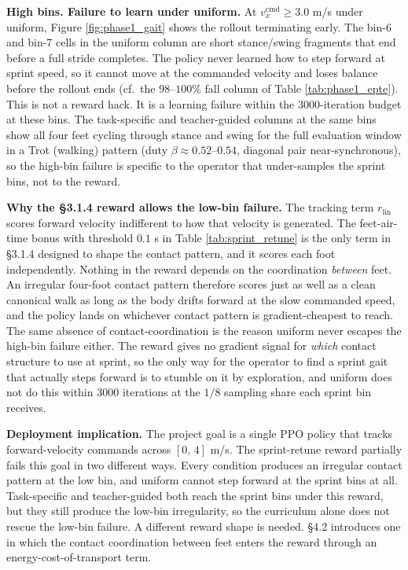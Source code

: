 \textbf{High bins. Failure to learn under uniform.} At $v_x^{\mathrm{cmd}} \ge 3.0$ m/s under uniform, Figure \ref{fig:phase1_gait} shows the rollout terminating early. The bin-6 and bin-7 cells in the uniform column are short stance/swing fragments that end before a full stride completes. The policy never learned how to step forward at sprint speed, so it cannot move at the commanded velocity and loses balance before the rollout ends (cf.\ the $98$--$100\%$ fall column of Table \ref{tab:phase1_epte}). This is not a reward hack. It is a learning failure within the $3000$-iteration budget at these bins. The task-specific and teacher-guided columns at the same bins show all four feet cycling through stance and swing for the full evaluation window in a Trot (walking) pattern (duty $\beta \approx 0.52$--$0.54$, diagonal pair near-synchronous), so the high-bin failure is specific to the operator that under-samples the sprint bins, not to the reward.

\textbf{Why the \S3.1.4 reward allows the low-bin failure.} The tracking term $r_{\mathrm{lin}}$ scores forward velocity indifferent to how that velocity is generated. The feet-air-time bonus with threshold $0.1$ s in Table \ref{tab:sprint_retune} is the only term in \S3.1.4 designed to shape the contact pattern, and it scores each foot independently. Nothing in the reward depends on the coordination \textit{between} feet. An irregular four-foot contact pattern therefore scores just as well as a clean canonical walk as long as the body drifts forward at the slow commanded speed, and the policy lands on whichever contact pattern is gradient-cheapest to reach. The same absence of contact-coordination is the reason uniform never escapes the high-bin failure either. The reward gives no gradient signal for \textit{which} contact structure to use at sprint, so the only way for the operator to find a sprint gait that actually steps forward is to stumble on it by exploration, and uniform does not do this within $3000$ iterations at the $1/8$ sampling share each sprint bin receives.

\textbf{Deployment implication.} The project goal is a single PPO policy that tracks forward-velocity commands across $[0,\,4]$ m/s. The sprint-retune reward partially fails this goal in two different ways. Every condition produces an irregular contact pattern at the low bin, and uniform cannot step forward at the sprint bins at all. Task-specific and teacher-guided both reach the sprint bins under this reward, but they still produce the low-bin irregularity, so the curriculum alone does not rescue the low-bin failure. A different reward shape is needed. \S4.2 introduces one in which the contact coordination between feet enters the reward through an energy-cost-of-transport term.

